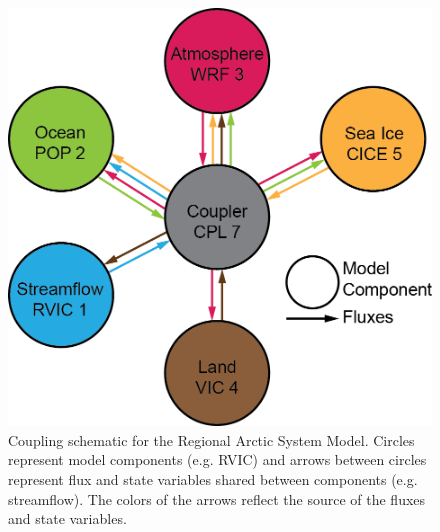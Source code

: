 \documentclass[jgrga, draft]{agutex}
\begin{document}
%
%
%
%

\clearpage
\begin{figure}
\noindent\includegraphics[width=40pc,natwidth=1]{RASM_coupling_schematic}
\caption{Coupling schematic for the Regional Arctic System Model. Circles represent model components (e.g. RVIC) and arrows between circles represent flux and state variables shared between components (e.g. streamflow). The colors of the arrows reflect the source of the fluxes and state variables.}
\label{fig:rasm_coupling_schematic}
\end{figure}
\end{document}
